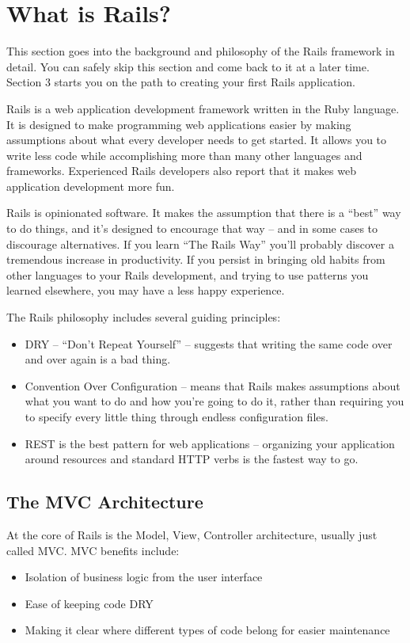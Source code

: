 \documentclass[10pt]{book}
\begin{document}
\section{ What is Rails?}

This section goes into the background and philosophy of the Rails framework in detail. You can safely skip this section and come back to it at a later time. Section 3 starts you on the path to creating your first Rails application.

Rails is a web application development framework written in the Ruby language. It is designed to make programming web applications easier by making assumptions about what every developer needs to get started. It allows you to write less code while accomplishing more than many other languages and frameworks. Experienced Rails developers also report that it makes web application development more fun.

Rails is opinionated software. It makes the assumption that there is a “best” way to do things, and it’s designed to encourage that way – and in some cases to discourage alternatives. If you learn “The Rails Way” you’ll probably discover a tremendous increase in productivity. If you persist in bringing old habits from other languages to your Rails development, and trying to use patterns you learned elsewhere, you may have a less happy experience.

The Rails philosophy includes several guiding principles:
\begin{itemize}
	\item DRY – “Don’t Repeat Yourself” – suggests that writing the same code over and over again is a bad thing.
	\item Convention Over Configuration – means that Rails makes assumptions about what you want to do and how you’re going to do it, rather than requiring you to specify every little thing through endless configuration files.
	\item REST is the best pattern for web applications – organizing your application around resources and standard HTTP verbs is the fastest way to go.
\end{itemize}

\subsection{ The MVC Architecture}

At the core of Rails is the Model, View, Controller architecture, usually just called MVC. MVC benefits include:
\begin{itemize}
	\item Isolation of business logic from the user interface
	\item Ease of keeping code DRY
	\item Making it clear where different types of code belong for easier maintenance
\end{itemize}
\end{document}
